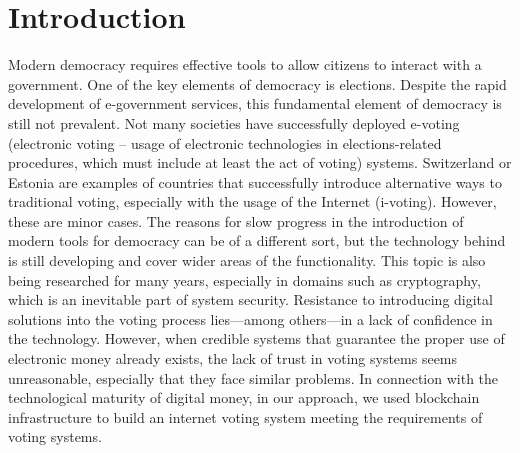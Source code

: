 \documentclass[applsci,article,submit,moreauthors,pdftex]{Definitions/mdpi}
\begin{document}
 


\section{Introduction}


Modern democracy requires effective tools to allow citizens to interact with a government. One of the key elements of democracy is elections. Despite the rapid development of e-government services,
this fundamental element of democracy is still not prevalent. Not many societies have successfully deployed e-voting (electronic voting -- usage of electronic technologies in elections-related procedures, which must include at least the act of voting) systems. 
Switzerland or Estonia are examples of countries that successfully introduce alternative ways to traditional voting, especially with the usage of the Internet (i-voting). However, these are minor cases.
The reasons for slow progress in the introduction of modern tools for democracy can be of a different sort, but the technology behind is still developing and cover wider areas of the functionality.
This topic is also being researched for many years, 
especially in domains such as cryptography, which is an inevitable part of system security. 
Resistance to introducing digital solutions into the voting process lies––among others––in a lack of confidence in the technology. However, when credible systems that guarantee the proper use of electronic money already exists, the lack of trust in voting systems seems unreasonable, especially that they face similar problems. In connection with the technological maturity of digital money, in our approach, we used blockchain infrastructure to build an internet voting system meeting the requirements of voting systems.
 
\end{document}
